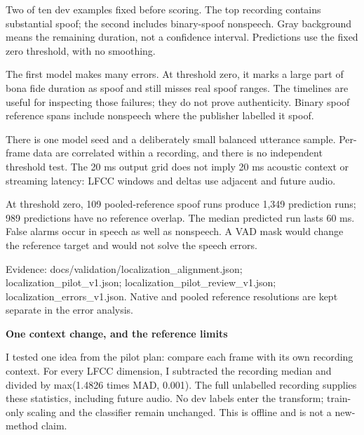 \documentclass[10pt,a4paper]{article}
\newcommand{\reporttitle}[1]{{\color{navy}\Large\bfseries #1}\par\vspace{5pt}}
\begin{document}
{\small Two of ten dev examples fixed before scoring. The top recording contains substantial spoof; the second includes binary-spoof nonspeech. Gray background means the remaining duration, not a confidence interval. Predictions use the fixed zero threshold, with no smoothing.}\par

The first model makes many errors. At threshold zero, it marks a large part of bona fide duration as spoof and still misses real spoof ranges. The timelines are useful for inspecting those failures; they do not prove authenticity. Binary spoof reference spans include nonspeech where the publisher labelled it spoof.\par

\par

There is one model seed and a deliberately small balanced utterance sample. Per-frame data are correlated within a recording, and there is no independent threshold test. The 20 ms output grid does not imply 20 ms acoustic context or streaming latency: LFCC windows and deltas use adjacent and future audio.\par

\par

At threshold zero, 109 pooled-reference spoof runs produce 1,349 prediction runs; 989 predictions have no reference overlap. The median predicted run lasts 60 ms. False alarms occur in speech as well as nonspeech. A VAD mask would change the reference target and would not solve the speech errors.\par

{\small Evidence: docs/validation/localization\_alignment.json; localization\_pilot\_v1.json; localization\_pilot\_review\_v1.json; localization\_errors\_v1.json. Native and pooled reference resolutions are kept separate in the error analysis.}\par

\clearpage

\reporttitle{One context change, and the reference limits}

I tested one idea from the pilot plan: compare each frame with its own recording context. For every LFCC dimension, I subtracted the recording median and divided by max(1.4826 times MAD, 0.001). The full unlabelled recording supplies these statistics, including future audio. No dev labels enter the transform; train-only scaling and the classifier remain unchanged. This is offline and is not a new-method claim.\par
\end{document}

